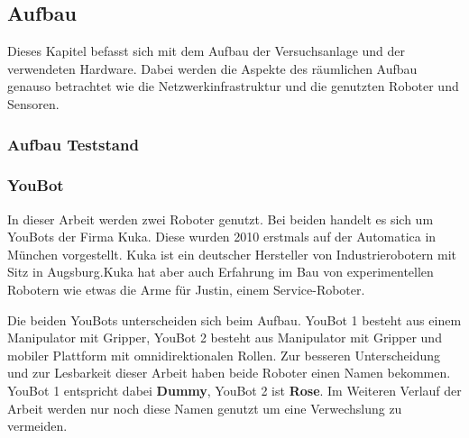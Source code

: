 \subsection{Aufbau}
\label{sec:basic-aufbau}
    
Dieses Kapitel befasst sich mit dem Aufbau der Versuchsanlage und der verwendeten Hardware. Dabei werden die Aspekte des räumlichen Aufbau genauso betrachtet wie die Netzwerkinfrastruktur und die genutzten Roboter und Sensoren.



\subsubsection{Aufbau Teststand}

% 
% 

\subsubsection{YouBot}
In dieser Arbeit werden zwei Roboter genutzt. Bei beiden handelt es sich um YouBots der Firma Kuka. Diese wurden 2010 erstmals auf der Automatica in München vorgestellt. Kuka ist ein deutscher Hersteller von Industrierobotern mit Sitz in Augsburg.Kuka hat aber auch Erfahrung im Bau von experimentellen Robotern wie etwas die Arme für Justin, einem Service-Roboter.

Die beiden YouBots unterscheiden sich beim Aufbau. YouBot 1 besteht aus einem Manipulator mit Gripper, YouBot 2 besteht aus Manipulator mit Gripper und mobiler Plattform mit omnidirektionalen Rollen. Zur besseren Unterscheidung und zur Lesbarkeit dieser Arbeit haben beide Roboter einen Namen bekommen. YouBot 1 entspricht dabei \textbf{Dummy}, YouBot 2 ist \textbf{Rose}. Im Weiteren Verlauf der Arbeit werden nur noch diese Namen genutzt um eine Verwechslung zu vermeiden.



